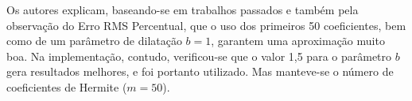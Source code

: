 Os autores explicam, baseando-se em trabalhos passados e também pela observação do Erro RMS Percentual, que o uso dos primeiros 50 coeficientes, bem como de um parâmetro de dilatação $b=1$, garantem uma aproximação muito boa. Na implementação, contudo, verificou-se que o valor 1,5 para o parâmetro $b$ gera resultados melhores, e foi portanto utilizado. Mas  manteve-se o número de coeficientes de Hermite ($m=50$).
